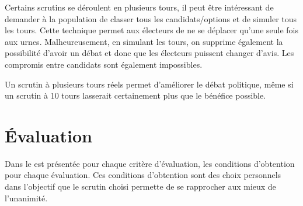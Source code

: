 \documentclass[../report]{subfiles}
\begin{document}
  Certains scrutins se déroulent en plusieurs tours, il peut être intéressant de demander à la 
  population de classer tous les candidats/options et de simuler tous les tours.
  Cette technique permet aux électeurs de ne se déplacer qu'une seule fois aux urnes.
  Malheureusement, en simulant les tours, on supprime également la possibilité d'avoir un
  débat et donc que les électeurs puissent changer d'avis.
  Les compromis entre candidats sont également impossibles.

  Un scrutin à plusieurs tours réels permet d'améliorer le débat politique, même si un scrutin 
  à 10 tours lasserait certainement plus que le bénéfice possible.

  \section{Évaluation}
  
  Dans le  est présentée pour chaque critère d'évaluation, les conditions d'obtention pour chaque évaluation.
  Ces conditions d'obtention sont des choix personnels dans l'objectif que le scrutin choisi permette de se rapprocher aux mieux de l'unanimité.
\end{document}
